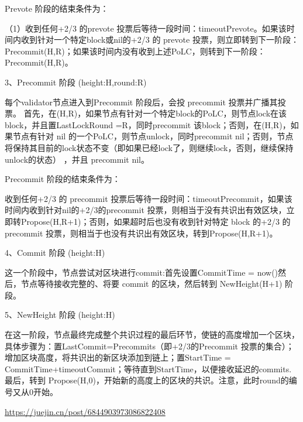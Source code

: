 \documentclass[a4paper,twoside]{scrbook}
\begin{document}
\begin{CJK}{UTF8}{gbsn}
Prevote 阶段的结束条件为：

（1）收到任何+2/3 的prevote 投票后等待一段时间：timeoutPrevote。如果该时间内收到针对一个特定block或nil的+2/3 的 prevote 投票，则立即转到下一阶段：Precommit(H,R)；如果该时间内没有收到上述PoLC，则转到下一阶段：Precommit(H,R)。

3、Precommit 阶段 (height:H,round:R)

每个validator节点进入到Precommit 阶段后，会投 precommit 投票并广播其投票。
首先，在(H,R)，如果节点有针对一个特定block的PoLC，则节点lock在该block，并且置LastLockRound =R，同时precommit 该block；否则，在(H,R)，如果节点有针对 nil 的一个PoLC，则节点unlock，同时precommit nil；否则，节点将保持其目前的lock状态不变（即如果已经lock了，则继续lock，否则，继续保持unlock的状态） ，并且 precommit nil。

Precommit 阶段的结束条件为：

收到任何+2/3 的 precommit 投票后等待一段时间：timeoutPrecommit，如果该时间内收到针对nil的+2/3的precommit 投票，则相当于没有共识出有效区块，立即转Propose(H,R+1)；否则，如果超时后也没有收到针对特定 block 的+2/3 的 precommit 投票，则相当于也没有共识出有效区块，转到Propose(H,R+1)。

4、Commit 阶段 (height:H)

这一个阶段中，节点尝试对区块进行commit:首先设置CommitTime = now()然后，节点等待接收完整的、将要 commit 的区块，然后转到 NewHeight(H+1) 阶段。

5、NewHeight 阶段 (height:H)

在这一阶段，节点最终完成整个共识过程的最后环节，使链的高度增加一个区块，具体步骤为：置LastCommit=Precommits（即+2/3的Precommit 投票的集合）；增加区块高度，将共识出的新区块添加到链上；置StartTime = CommitTime+timeoutCommit；等待直到StartTime，以便接收延迟的commits.最后，转到 Propose(H,0)，开始新的高度上的区块的共识。注意，此时round的编号又从0开始。

\url{https://juejin.cn/post/6844903973086822408}

\printbibliography
\end{CJK}
\end{document}
